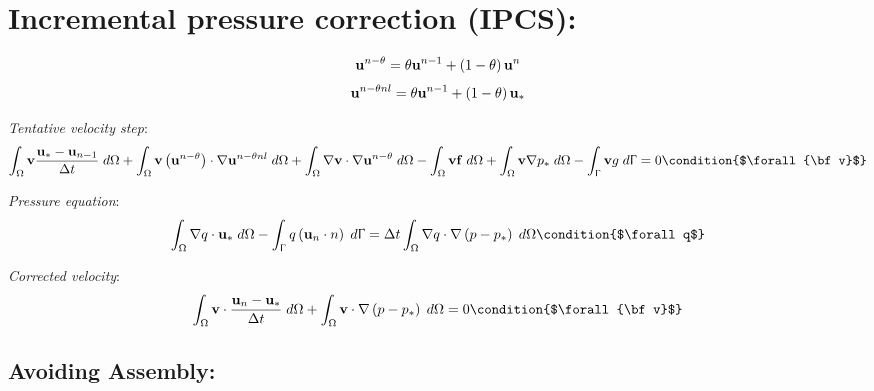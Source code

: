\documentclass[11pt,a4paper]{article}
\title{}
\author{Samuel Parkinson}
\date{\today}
\begin{document}
\section{Incremental pressure correction (IPCS):}

\begin{dmath}
  {\bf u}^{n-\theta} = \theta {\bf u}^{n-1} + \left(1 - \theta \right) {\bf u}^{n}
\end{dmath}
\begin{dmath}
  {\bf u}^{n-\theta nl} = \theta {\bf u}^{n-1} + \left(1 - \theta \right) {\bf u}_*
\end{dmath}

\emph{Tentative velocity step}:
\begin{dmath}
  \int_\Omega {\bf v} \frac{{\bf u}_* - {\bf u}_{n-1}}{\Delta t} \; d\Omega + \int_\Omega {\bf v} \left( {\bf u}^{n-\theta} \right) \cdot \nabla {\bf u}^{n-\theta nl} \; d\Omega + \int_\Omega \nabla {\bf v} \cdot \nabla {\bf u}^{n-\theta} \; d\Omega - \int_\Omega {\bf v} {\bf f} \; d\Omega + \int_\Omega {\bf v} \nabla p_* \; d\Omega \\ - \int_\Upgamma {\bf v} g \; d\Upgamma = 0 \condition{$\forall {\bf v}$}
\end{dmath}

\emph{Pressure equation}:
\begin{dmath}
  \int_\Omega \nabla q \cdot {\bf u}_* \; d\Omega - \int_\Upgamma q \left( {\bf u}_{n} \cdot n \right) \; d\Upgamma = \Delta t \int_\Omega \nabla q \cdot \nabla \left(p - p_* \right) \; d\Omega  \condition{$\forall q$}
\end{dmath}

\emph{Corrected velocity}:
\begin{dmath}
  \int_\Omega {\bf v} \cdot \frac{{\bf u}_n - {\bf u}_*}{\Delta t} \; d\Omega + \int_\Omega {\bf v} \cdot \nabla \left(p - p_* \right) \; d\Omega = 0 \condition{$\forall {\bf v}$}
\end{dmath}

\subsection{Avoiding Assembly:}
\end{document}
